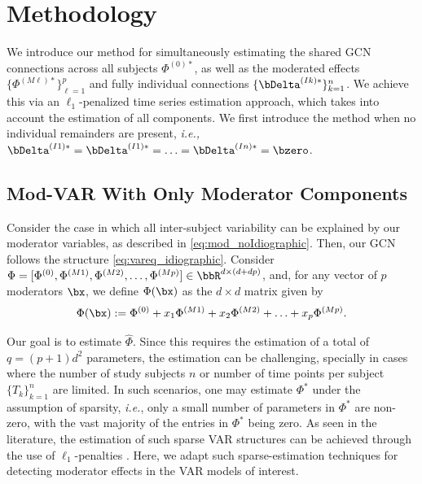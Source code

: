 \section{Methodology}\label{section:method}

We introduce our method for simultaneously estimating the shared GCN connections across all subjects $\Phi^{(0)*}$, as well as the moderated effects $\{\Phi^{(M\ell)*}\}_{\ell = 1}^p$ and fully individual connections $\{\bDelta^{(Ik)*}\}_{k=1}^n$. We achieve this via an $\ell_1$-penalized time series estimation approach, which takes into account the estimation of all components. We first introduce the method when no individual remainders are present, \textit{i.e.,} $\bDelta^{(I1)*} = \bDelta^{(I1)*} = \ldots = \bDelta^{(In)*} = \bzero $. 

\subsection{Mod-VAR With Only Moderator Components}\label{subsec:modvar_moderator}

Consider the case in which all inter-subject variability can be explained by our moderator variables, as described in \eqref{eq:mod_noIdiographic}. Then, our GCN follows the structure \eqref{eq:vareq_idiographic}. Consider $\Phi = [\Phi^{(0)} , \Phi^{(M1)} , \Phi^{(M2)} ,\ldots , \Phi^{(Mp)}]\in\bbR^{d\times (d+dp)}$, and, for any vector of $p$ moderators $\bx$, we define $\Phi(\bx)$ as the $d\times d$ matrix given by
\begin{equation}\label{eq:mod_est_noIdiographic}
    \Phi(\bx) := \Phi^{(0)}  + x_1 \Phi^{(M1)} + x_2 \Phi^{(M2)} + \ldots + x_p \Phi^{(Mp)}. 
\end{equation}

Our goal is to estimate $\hat\Phi$. Since this requires the estimation of a total of $q = (p + 1) d^2$ parameters, the estimation can be challenging, specially in cases where the number of study subjects $n$ or number of time points per subject $\{T_k\}_{k=1}^n$ are limited. In such scenarios, one may estimate $\Phi^{*}$ under the assumption of sparsity, \textit{i.e.}, only a small number of parameters in $\Phi^{*} $ are non-zero, with the vast majority of the entries in $\Phi^*$ being zero. As seen in the literature, the estimation of such sparse VAR structures can be achieved through the use of $\ell_1$-penalties \cite{basu2015regularized,fisher2022penalized}. Here, we adapt such sparse-estimation techniques for detecting moderator effects in the VAR models of interest.

